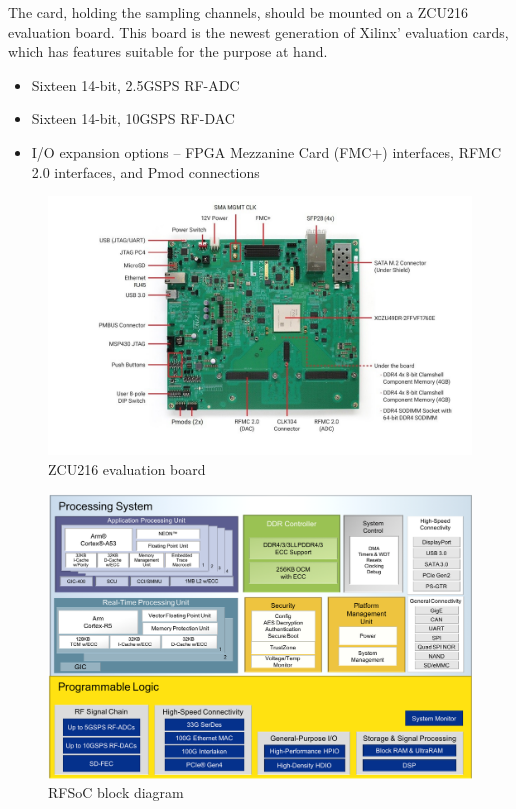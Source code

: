 The card, holding the sampling channels, should be mounted on a ZCU216 evaluation board. This board is the newest generation of Xilinx' evaluation cards, which has features suitable for the purpose at hand.
\begin{itemize}[noitemsep]
\item Sixteen 14-bit, 2.5GSPS RF-ADC
\item Sixteen 14-bit, 10GSPS RF-DAC
\item I/O expansion options – FPGA Mezzanine Card (FMC+) interfaces, RFMC 2.0 interfaces, and Pmod connections
\end{itemize}
\begin{figure}[tbh]
	\centering
	\includegraphics[width = \textwidth]{chap/04-work/img/zcu216}
	\caption{ZCU216 evaluation board}
	\label{fig:zcu216}
\end{figure}
 
\begin{figure}[tbh]
	\centering
	\includegraphics[width = \textwidth]{chap/04-work/img/rfsoc_blockdiagram}
	\caption{RFSoC block diagram}
	\label{fig:rfsoc}
\end{figure}

